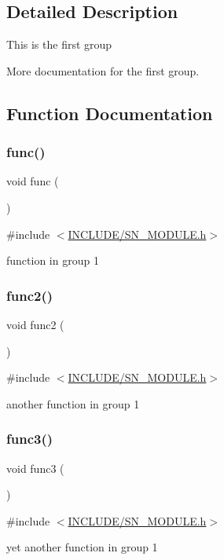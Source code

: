 \subsection{Detailed Description}
This is the first group

More documentation for the first group. 

\subsection{Function Documentation}
\mbox{\label{group__group1_ga24f647174760cac13d2624b5ad74b00c}} 
\subsubsection{\texorpdfstring{func()}{func()}}
{\footnotesize\ttfamily void func (\begin{DoxyParamCaption}{ }\end{DoxyParamCaption})}



{\ttfamily \#include $<$\hyperlink{SN__MODULE_8h}{I\+N\+C\+L\+U\+D\+E/\+S\+N\+\_\+\+M\+O\+D\+U\+L\+E.\+h}$>$}

function in group 1 \mbox{\label{group__group1_ga053929c0809a5f56f7548fd7d9968f31}} 
\subsubsection{\texorpdfstring{func2()}{func2()}}
{\footnotesize\ttfamily void func2 (\begin{DoxyParamCaption}{ }\end{DoxyParamCaption})}



{\ttfamily \#include $<$\hyperlink{SN__MODULE_8h}{I\+N\+C\+L\+U\+D\+E/\+S\+N\+\_\+\+M\+O\+D\+U\+L\+E.\+h}$>$}

another function in group 1 \mbox{\label{group__group1_gadbf675591ff057ec48ce35b0d5cdf755}} 
\subsubsection{\texorpdfstring{func3()}{func3()}}
{\footnotesize\ttfamily void func3 (\begin{DoxyParamCaption}{ }\end{DoxyParamCaption})}



{\ttfamily \#include $<$\hyperlink{SN__MODULE_8h}{I\+N\+C\+L\+U\+D\+E/\+S\+N\+\_\+\+M\+O\+D\+U\+L\+E.\+h}$>$}

yet another function in group 1 
